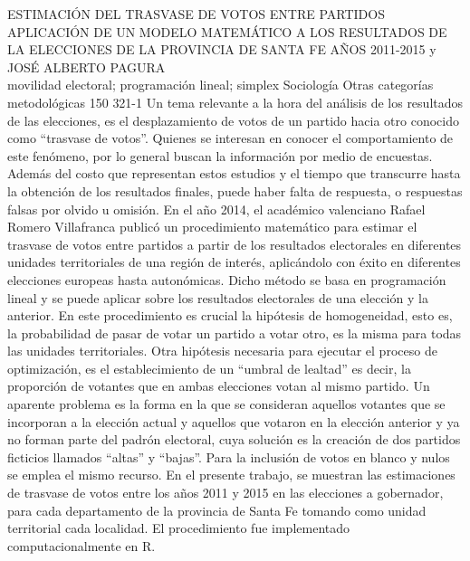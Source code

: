 \A
{ESTIMACIÓN DEL TRASVASE DE VOTOS ENTRE PARTIDOS APLICACIÓN DE UN MODELO MATEMÁTICO A LOS RESULTADOS DE LA ELECCIONES DE LA PROVINCIA DE SANTA FE AÑOS 2011-2015}
{ y JOSÉ ALBERTO PAGURA}
{
\\}
{movilidad electoral; programación lineal; simplex} 
 {Sociología} 
 {Otras categorías metodológicas} 
 {150} 
 {321-1}
{Un tema relevante a la hora del análisis de los resultados de las elecciones, es el desplazamiento de votos de un partido hacia otro conocido como “trasvase de votos”. Quienes se interesan en conocer el comportamiento de este fenómeno, por lo general buscan la información por medio de encuestas. Además del costo que representan estos estudios y el tiempo que transcurre hasta la obtención de los resultados finales, puede haber falta de respuesta, o respuestas falsas por olvido u omisión. En el año 2014, el académico valenciano Rafael Romero Villafranca publicó un procedimiento matemático para estimar el trasvase de votos entre partidos a partir de los resultados electorales en diferentes unidades territoriales de una región de interés, aplicándolo con éxito en diferentes elecciones europeas hasta autonómicas. Dicho método se basa en programación lineal y se puede aplicar sobre los resultados electorales de una elección y la anterior. En este procedimiento es crucial la hipótesis de homogeneidad, esto es, la probabilidad de pasar de votar un partido a votar otro, es la misma para todas las unidades territoriales. Otra hipótesis necesaria para ejecutar el proceso de optimización, es el establecimiento de un “umbral de lealtad” es decir, la proporción de votantes que en ambas elecciones votan al mismo partido. Un aparente problema es la forma en la que se consideran aquellos votantes que se incorporan a la elección actual y aquellos que votaron en la elección anterior y ya no forman parte del padrón electoral, cuya solución es la creación de dos partidos ficticios llamados “altas” y “bajas”. Para la inclusión de votos en blanco y nulos se emplea el mismo recurso. En el presente trabajo, se muestran las estimaciones de trasvase de votos entre los años 2011 y 2015 en las elecciones a gobernador, para cada departamento de la provincia de Santa Fe tomando como unidad territorial cada localidad. El procedimiento fue implementado computacionalmente en R. }
